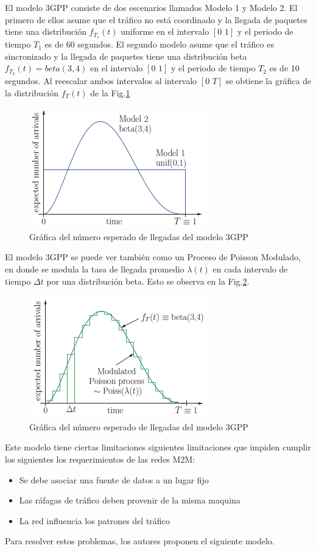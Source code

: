 \documentclass[journal]{IEEEtran}
\begin{document}
El modelo 3GPP consiste de dos escenarios llamados Modelo 1 y Modelo 2. El primero de ellos asume que el tr\'afico no est\'a coordinado y la llegada de paquetes tiene una distribuci\'on $f_{T_1}(t)$ uniforme en el intervalo $[0\hspace{4pt}1]$ y el periodo de tiempo $T_1$ es de 60 segundos. El segundo modelo asume que el tr\'afico es sincronizado y la llegada de paquetes tiene una distribuci\'on beta $f_{T_2}(t)=beta(3,4)$ en el intervalo $[0\hspace{4pt}1]$ y el periodo de tiempo $T_2$ es de 10 segundos. Al reescalar ambos intervalos al intervalo $[0\hspace{4pt}T]$ se obtiene la gr\'afica de la distribuci\'on $f_T(t)$ de la Fig.\ref{3GPP1}
\begin{figure}[h]
\centering
\includegraphics[scale=0.85]{graf1}
\caption{Gr\'afica del n\'umero esperado de llegadas del modelo 3GPP}
\label{3GPP1} 
\end{figure}
El modelo 3GPP se puede ver tambi\'en como un Proceso de Poisson Modulado, en donde se modula la tasa de llegada promedio $\lambda(t)$ en cada intervalo de tiempo $\Delta t$ por una distribuci\'on beta. Esto se observa en la Fig.\ref{3GPP2}.
\begin{figure}[h]
\centering
\includegraphics[scale=0.85]{graf2}
\caption{Gr\'afica del n\'umero esperado de llegadas del modelo 3GPP}
\label{3GPP2}
\end{figure} 
Este modelo tiene ciertas limitaciones siguientes limitaciones que impiden cumplir los siguientes los requerimientos de las redes M2M:
\begin{itemize}
\item Se debe asociar una fuente de datos a un lugar fijo 
\item Las r\'afagas de tr\'afico deben provenir de la misma maquina
\item La red influencia los patrones del tr\'afico
\end{itemize}
Para resolver estos problemas, los autores proponen el siguiente modelo.
\end{document}
